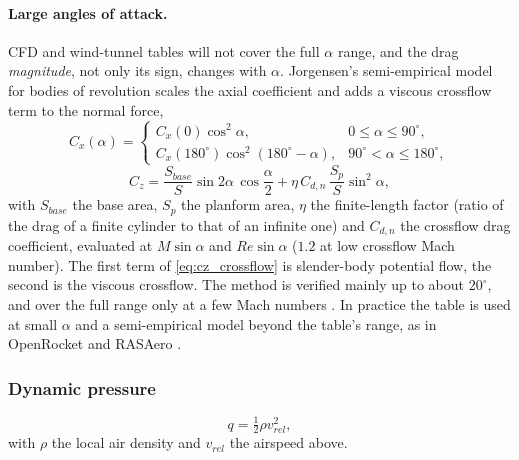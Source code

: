 \paragraph{Large angles of attack.} CFD and wind-tunnel tables will not cover the full $\alpha$
range, and the drag \emph{magnitude}, not only its sign, changes with $\alpha$. Jorgensen's
semi-empirical model for bodies of revolution \cite{jorgensen} scales the axial coefficient and adds
a viscous crossflow term to the normal force,
\begin{equation} \label{eq:cx_full}
    C_x(\alpha) = \begin{cases}
        C_x(0)\cos^2\alpha, & 0\le\alpha\le90^\circ, \\
        C_x(180^\circ)\cos^2(180^\circ-\alpha), & 90^\circ<\alpha\le180^\circ,
    \end{cases}
\end{equation}
\begin{equation} \label{eq:cz_crossflow}
    C_z = \frac{S_{base}}{S}\sin2\alpha\,\cos\frac{\alpha}{2}
        + \eta\,C_{d,n}\,\frac{S_p}{S}\sin^2\alpha,
\end{equation}
with $S_{base}$ the base area, $S_p$ the planform area, $\eta$ the finite-length factor (ratio of
the drag of a finite cylinder to that of an infinite one) and $C_{d,n}$ the crossflow drag
coefficient, evaluated at $M\sin\alpha$ and $Re\sin\alpha$ ($1.2$ at low crossflow Mach number).
The first term of \autoref{eq:cz_crossflow} is slender-body potential flow, the second is the
viscous crossflow. The method is verified mainly up to about $20^\circ$, and over the full range
only at a few Mach numbers \cite{jorgensen}. In practice the table is used at small $\alpha$ and a
semi-empirical model beyond the table's range, as in OpenRocket and RASAero
\cite{ortech,rasaerom}.

\subsubsection{Dynamic pressure}
\begin{equation}
    q = \tfrac12\rho v_{rel}^2,
\end{equation}
with $\rho$ the local air density and $v_{rel}$ the airspeed above.

